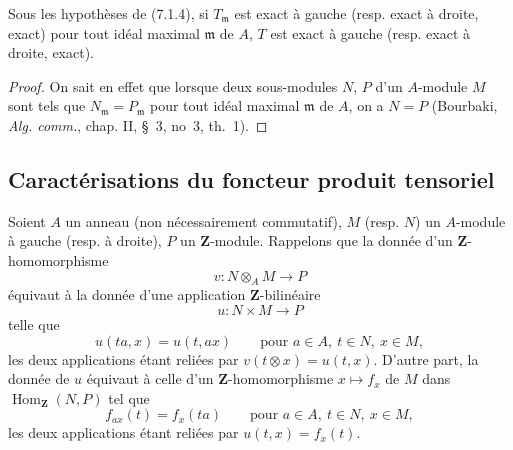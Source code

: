 \begin{proposition}[7.1.5]
Sous les hypothèses de (7.1.4), si $T_{\mathfrak m}$ est exact à gauche
(resp. exact à droite, exact) pour tout idéal maximal $\mathfrak m$ de $A$,
$T$ est exact à gauche (resp. exact à droite, exact).
\end{proposition}

\begin{proof}
On sait en effet que lorsque deux sous-modules $N$, $P$ d'un $A$-module $M$
sont tels que $N_{\mathfrak m}=P_{\mathfrak m}$ pour tout idéal maximal
$\mathfrak m$ de $A$, on a $N=P$ (Bourbaki, \emph{Alg. comm.}, chap. II,
\S~3, no~3, th.~1).
\end{proof}

\subsection{Caractérisations du foncteur produit tensoriel}
\label{subsection:III.7.2.fr}

\begin{env}[7.2.1]
Soient $A$ un anneau (non nécessairement commutatif), $M$ (resp. $N$) un
$A$-module à gauche (resp. à droite), $P$ un $\mathbf Z$-module. Rappelons
que la donnée d'un $\mathbf Z$-homomorphisme
\[
  v:N\otimes_A M\longrightarrow P
\]
équivaut à la donnée d'une application $\mathbf Z$-bilinéaire
\[
  u:N\times M\longrightarrow P
\]
telle que
\[
  u(ta,x)=u(t,ax)
  \qquad\text{pour }a\in A,\ t\in N,\ x\in M,
\]
les deux applications étant reliées par $v(t\otimes x)=u(t,x)$. D'autre part,
la donnée de $u$ équivaut à celle d'un
$\mathbf Z$-homomorphisme $x\mapsto f_x$ de $M$ dans
$\operatorname{Hom}_{\mathbf Z}(N,P)$ tel que
\[
  f_{ax}(t)=f_x(ta)
  \qquad\text{pour }a\in A,\ t\in N,\ x\in M,
\]
les deux applications étant reliées par $u(t,x)=f_x(t)$.
\end{env}

